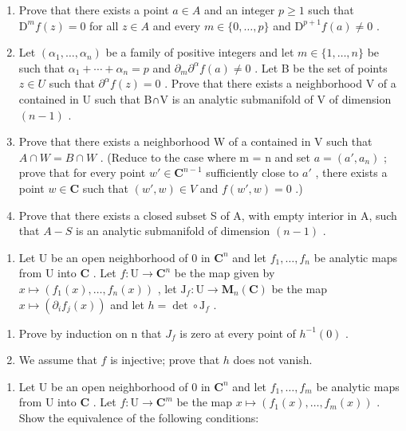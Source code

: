 \begin{enumerate}
\def\labelenumi{\alph{enumi})}
\item
  Prove that there exists a point \(a \in A\) and an integer \(p \geqslant 1\) such that \(\mathrm{D}^{m}f(z) = 0\) for all \(z \in A\) and every \(m \in \{0, \ldots, p\}\) and \(\mathrm{D}^{p+1}f(a) \neq 0\) .
\item
  Let \((\alpha_{1},\ldots,\alpha_{n})\) be a family of positive integers and let \(m\in\{1,\ldots,n\}\) be such that \(\alpha_{1}+\cdots+\alpha_{n}=p\) and \(\partial_{m}\partial^{\alpha}f(a)\neq0\) . Let B be the set of points \(z\in U\) such that \(\partial^{\alpha}f(z)=0\) . Prove that there exists a neighborhood V of a contained in U such that B∩V is an analytic submanifold of V of dimension \((n-1)\) .
\item
  Prove that there exists a neighborhood W of a contained in V such that \(A \cap W = B \cap W\) . (Reduce to the case where m = n and set \(a = (a', a_n)\) ; prove that for every point \(w' \in \mathbf{C}^{n-1}\) sufficiently close to \(a'\) , there exists a point \(w \in \mathbf{C}\) such that \((w', w) \in V\) and \(f(w', w) = 0\) .)
\item
  Prove that there exists a closed subset S of A, with empty interior in A, such that \(A - S\) is an analytic submanifold of dimension \((n - 1)\) .
\end{enumerate}

\begin{enumerate}
\def\labelenumi{\arabic{enumi})}
\setcounter{enumi}{4}
\tightlist
\item
  Let U be an open neighborhood of 0 in \(\mathbf{C}^n\) and let \(f_1, \ldots, f_n\) be analytic maps from U into \(\mathbf{C}\) . Let \(f\colon \mathrm{U} \to \mathbf{C}^n\) be the map given by \(x \mapsto (f_1(x), \ldots, f_n(x))\) , let \(\mathrm{J}_f\colon \mathrm{U} \to \mathbf{M}_n(\mathbf{C})\) be the map \(x \mapsto (\partial_i f_j(x))\) and let \(h = \det \circ \mathrm{J}_f\) .
\end{enumerate}

\begin{enumerate}
\def\labelenumi{\alph{enumi})}
\item
  Prove by induction on n that \(J_{f}\) is zero at every point of \(h^{-1}(0)\) .
\item
  We assume that \(f\) is injective; prove that \(h\) does not vanish.
\end{enumerate}

\begin{enumerate}
\def\labelenumi{\arabic{enumi})}
\setcounter{enumi}{5}
\tightlist
\item
  Let U be an open neighborhood of 0 in \(\mathbf{C}^{n}\) and let \(f_{1},\ldots ,f_{m}\) be analytic maps from U into \(\mathbf{C}\) . Let \(f\colon \mathrm{U}\to \mathbf{C}^m\) be the map \(x\mapsto (f_1(x),\dots ,f_m(x))\) . Show the equivalence of the following conditions:
\end{enumerate}

